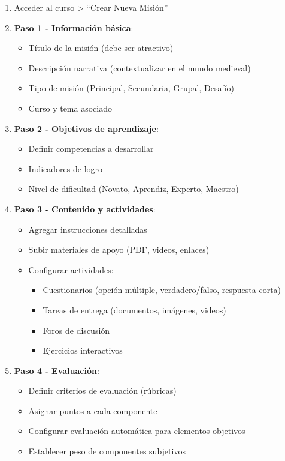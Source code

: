 \begin{enumerate}
	\item Acceder al curso > ``Crear Nueva Misión''
	\item \textbf{Paso 1 - Información básica}:
	\begin{itemize}
		\item Título de la misión (debe ser atractivo)
		\item Descripción narrativa (contextualizar en el mundo medieval)
		\item Tipo de misión (Principal, Secundaria, Grupal, Desafío)
		\item Curso y tema asociado
	\end{itemize}
	\item \textbf{Paso 2 - Objetivos de aprendizaje}:
	\begin{itemize}
		\item Definir competencias a desarrollar
		\item Indicadores de logro
		\item Nivel de dificultad (Novato, Aprendiz, Experto, Maestro)
	\end{itemize}
	\item \textbf{Paso 3 - Contenido y actividades}:
	\begin{itemize}
		\item Agregar instrucciones detalladas
		\item Subir materiales de apoyo (PDF, videos, enlaces)
		\item Configurar actividades:
		\begin{itemize}
			\item Cuestionarios (opción múltiple, verdadero/falso, respuesta corta)
			\item Tareas de entrega (documentos, imágenes, videos)
			\item Foros de discusión
			\item Ejercicios interactivos
		\end{itemize}
	\end{itemize}
	\item \textbf{Paso 4 - Evaluación}:
	\begin{itemize}
		\item Definir criterios de evaluación (rúbricas)
		\item Asignar puntos a cada componente
		\item Configurar evaluación automática para elementos objetivos
		\item Establecer peso de componentes subjetivos
	\end{itemize}

\end{enumerate}
